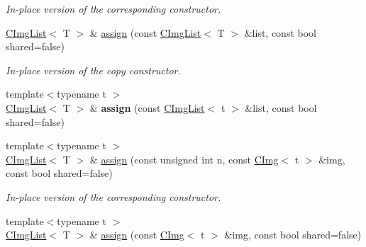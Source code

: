 \begin{DoxyCompactItemize}
\begin{DoxyCompactList}\small\item\em In-\/place version of the corresponding constructor. \item\end{DoxyCompactList}\item 
\hypertarget{structcimg__library_1_1CImgList_a32c1d00030d825734734220045fb037c}{
\hyperlink{structcimg__library_1_1CImgList}{CImgList}$<$ T $>$ \& \hyperlink{structcimg__library_1_1CImgList_a32c1d00030d825734734220045fb037c}{assign} (const \hyperlink{structcimg__library_1_1CImgList}{CImgList}$<$ T $>$ \&list, const bool shared=false)}
\label{structcimg__library_1_1CImgList_a32c1d00030d825734734220045fb037c}

\begin{DoxyCompactList}\small\item\em In-\/place version of the copy constructor. \item\end{DoxyCompactList}\item 
\hypertarget{structcimg__library_1_1CImgList_aeb5dec5cebe0d74bb2ede2e78f65b683}{
{\footnotesize template$<$typename t $>$ }\\\hyperlink{structcimg__library_1_1CImgList}{CImgList}$<$ T $>$ \& {\bfseries assign} (const \hyperlink{structcimg__library_1_1CImgList}{CImgList}$<$ t $>$ \&list, const bool shared=false)}
\label{structcimg__library_1_1CImgList_aeb5dec5cebe0d74bb2ede2e78f65b683}

\item 
\hypertarget{structcimg__library_1_1CImgList_a40666c4099c041777ca2ed1b0747f81b}{
{\footnotesize template$<$typename t $>$ }\\\hyperlink{structcimg__library_1_1CImgList}{CImgList}$<$ T $>$ \& \hyperlink{structcimg__library_1_1CImgList_a40666c4099c041777ca2ed1b0747f81b}{assign} (const unsigned int n, const \hyperlink{structcimg__library_1_1CImg}{CImg}$<$ t $>$ \&img, const bool shared=false)}
\label{structcimg__library_1_1CImgList_a40666c4099c041777ca2ed1b0747f81b}

\begin{DoxyCompactList}\small\item\em In-\/place version of the corresponding constructor. \item\end{DoxyCompactList}\item 
\hypertarget{structcimg__library_1_1CImgList_a1e358f65ab400e6a27d80f26afe9aeb6}{
{\footnotesize template$<$typename t $>$ }\\\hyperlink{structcimg__library_1_1CImgList}{CImgList}$<$ T $>$ \& \hyperlink{structcimg__library_1_1CImgList_a1e358f65ab400e6a27d80f26afe9aeb6}{assign} (const \hyperlink{structcimg__library_1_1CImg}{CImg}$<$ t $>$ \&img, const bool shared=false)}
\label{structcimg__library_1_1CImgList_a1e358f65ab400e6a27d80f26afe9aeb6}


\end{DoxyCompactItemize}

